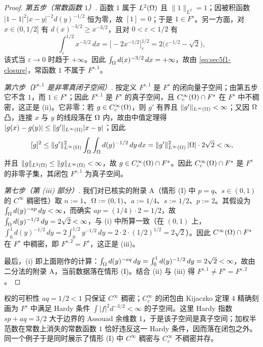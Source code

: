 \begin{proof}
\emph{第五步（常数函数 $1$）}. 函数 $1$ 属于 $L^2(\Omega)$ 且 $\|1\|_{L^2}=1$；因被积函数 $|1-1|^2|x-y|^{-2}d(y)^{-1/2}$ 恒为零，故 $[1]=0$；于是 $1\in F^s$。另一方面，对 $x\in(0,1/2]$ 有 $d(x)^{-3/2}\ge x^{-3/2}$，且对 $0<\varepsilon<1/2$ 有
\[
  \int_\varepsilon^{1/2}x^{-3/2}\,dx=\Big[-2x^{-1/2}\Big]_\varepsilon^{1/2}=2\big(\varepsilon^{-1/2}-\sqrt2\big),
\]
该式当 $\varepsilon\to0$ 时趋于 $+\infty$。因此 $\int_\Omega d(x)^{-3/2}\,dx=+\infty$，故由 \eqref{eq:sec5f1-closure}，常函数 $1$ 不属于 $F^{s,1}$。

\emph{第六步（$F^{s,1}$ 是非零真闭子空间）}. 按定义 $F^{s,1}$ 是 $F^s$ 的闭向量子空间；由第五步它不含 $1$，而 $1\in F^s$；因此 $F^{s,1}$ 是 $F^s$ 的真子空间，且 $C_c^\infty(\Omega)\cap F^s$ 在 $F^s$ 中不稠密，这正是 (ii)。它非零：若 $g\in C_c^\infty(\Omega)$，则 $g'$ 有界且 $\|g'\|_{L^\infty(\Omega)}<\infty$；又因 $\Omega$ 凸，连接 $x$ 与 $y$ 的线段落在 $\Omega$ 内，故由中值定理得 $|g(x)-g(y)|\le\|g'\|_{L^\infty(\Omega)}|x-y|$；因此
\[
  [g]^2\le\|g'\|_{L^\infty(\Omega)}^2\int_\Omega\int_\Omega d(y)^{-1/2}\,dy\,dx
  =\|g'\|_{L^\infty(\Omega)}^2\,|\Omega|\cdot2\sqrt2<\infty,
\]
并且 $\|g\|_{L^2(\Omega)}\le\|g\|_{L^\infty(\Omega)}<\infty$，故 $g\in C_c^\infty(\Omega)\cap F^s$。因此 $C_c^\infty(\Omega)\cap F^s$ 是 $F^s$ 的非零子集，其闭包 $F^{s,1}$ 为真子空间。

\emph{第七步（第 (iii) 部分）}. 我们对已核实的附录 A（情形 (I) 中 $p=q$、$s\in(0,1)$ 的 $C^\infty$ 稠密性）取 $n:=1$、$\Omega:=(0,1)$、$a:=1/4$、$s:=1/2$、$p:=2$。其假设为 $\int_\Omega d(y)^{-ap}\,dy<\infty$，而确实 $ap=(1/4)\cdot2=1/2$，故 $\int_\Omega d(y)^{-1/2}\,dy=2\sqrt2<\infty$，与 (i) 中所算一致（在 $(0,1)$ 上，$\int_0^1 d(y)^{-1/2}\,dy=2\int_0^{1/2}y^{-1/2}\,dy=2\cdot2\cdot(1/2)^{1/2}=2\sqrt2$）。因此 $C^\infty(\Omega)\cap F^s$ 在 $F^s$ 中稠密，即 $F^{s,2}=F^s$，这正是 (iii)。

最后，(i) 即上面刚作的计算：$\int_\Omega d(y)^{-aq}\,dy=\int_0^1 d(y)^{-1/2}\,dy=2\sqrt2<\infty$，故由二分法的附录 A，当前数据落在情形 (I)。结合 (ii) 与 (iii) 得 $F^{s,1}\neq F^s=F^{s,2}$。
\end{proof}

\begin{remark}[直觉]
权的可积性 $aq=1/2<1$ 只保证 $C^\infty$ 稠密；$C_c^\infty$ 的闭包由 Kijaczko 定理 4 精确刻画为 $F^s$ 中满足 Hardy 条件 $\int|f|^2d^{-3/2}<\infty$ 的子空间。这里 Hardy 指数 $sp+aq=3/2$ 大于边界的 Assouad 余维数 $1$，于是该子空间是真子空间；加权半范数在常数上消失的常数函数 $1$ 恰好违反这一 Hardy 条件，因而落在闭包之外。同一个例子于是同时展示了情形 (I) 中 $C^\infty$ 稠密与 $C_c^\infty$ 不稠密并存。
\end{remark}

